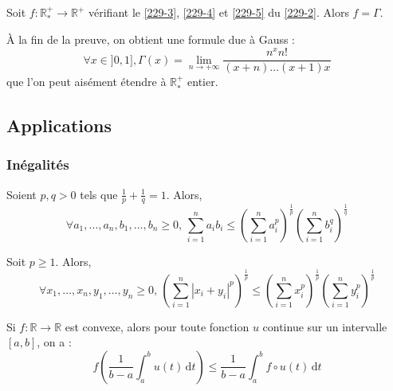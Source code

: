 
  \begin{theorem}
    Soit $f : \mathbb{R}^+_* \rightarrow \mathbb{R}^+$ vérifiant le \cref{229-3}, \cref{229-4} et \cref{229-5} du \cref{229-2}. Alors $f = \Gamma$.
  \end{theorem}

  \begin{remark}
    À la fin de la preuve, on obtient une formule due à Gauss :
    \[ \forall x \in ]0, 1], \Gamma(x) = \lim_{n \rightarrow +\infty} \frac{n^x n!}{(x+n) \dots (x+1)x} \]
    que l'on peut aisément étendre à $\mathbb{R}^+_*$ entier.
  \end{remark}

  \subsection{Applications}

  \subsubsection{Inégalités}


  \begin{proposition}
    Soient $p, q > 0$ tels que $\frac{1}{p} + \frac{1}{q} = 1$. Alors,
    \[ \forall a_1, \dots, a_n, b_1, \dots, b_n \geq 0, \, \sum_{i=1}^n a_i b_i \leq \left( \sum_{i=1}^n a_i^p \right)^{\frac{1}{p}} \left( \sum_{i=1}^n b_i^q \right)^{\frac{1}{q}} \]
  \end{proposition}

  \begin{proposition}
    Soit $p \geq 1$. Alors,
    \[ \forall x_1, \dots, x_n, y_1, \dots, y_n \geq 0, \, \left( \sum_{i=1}^n |x_i + y_i|^p \right)^{\frac{1}{p}} \leq \left( \sum_{i=1}^n x_i^p \right)^{\frac{1}{p}} \left( \sum_{i=1}^n y_i^p \right)^{\frac{1}{p}} \]
  \end{proposition}


  \begin{proposition}
    Si $f : \mathbb{R} \rightarrow \mathbb{R}$ est convexe, alors pour toute fonction $u$ continue sur un intervalle $[a, b]$, on a :
    \[ f \left( \frac{1}{b-a} \int_a^b u(t) \, \mathrm{d}t \right) \leq \frac{1}{b-a} \int_a^b f \circ u (t) \, \mathrm{d}t \]
  \end{proposition}


